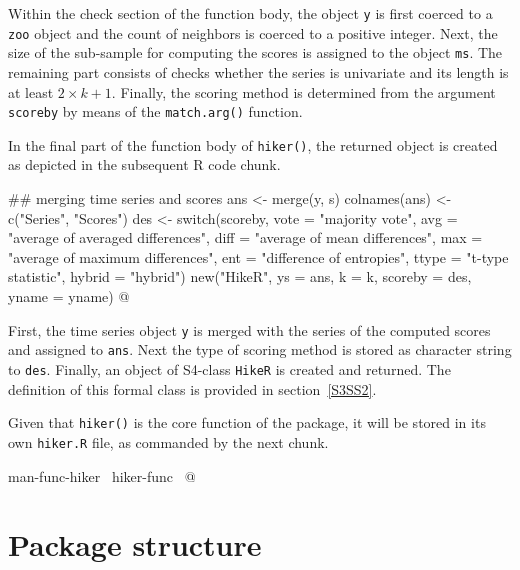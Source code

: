 \documentclass[a4paper]{article}
\begin{document}
Within the check section of the function body, the object \verb?y? is
first coerced to a \verb?zoo? object and the count of neighbors is
coerced to a positive integer. Next, the size of the sub-sample for
computing the scores is assigned to the object \verb?ms?. The remaining
part consists of checks whether the series is univariate and its
length is at least $2 \times k + 1$. Finally, the scoring method is
determined from the argument \verb?scoreby? by means of the \verb?match.arg()?
function.\par

In the final part of the function body of \verb?hiker()?, the returned
object is created as depicted in the subsequent R code chunk.

\nwenddocs{}\endmoddef
    ## merging time series and scores
    ans <- merge(y, s)
    colnames(ans) <- c("Series", "Scores")
    des <- switch(scoreby,
                  vote = "majority vote",
                  avg = "average of averaged differences",
                  diff = "average of mean differences",
                  max = "average of maximum differences",
                  ent = "difference of entropies",
                  ttype = "t-type statistic",
                  hybrid = "hybrid")
    new("HikeR", ys = ans, k = k, scoreby = des, yname = yname)
\nwendcode{}@

First, the time series object \verb?y? is merged with the series of the
computed scores and assigned to \verb?ans?. Next the type of scoring
method is stored as character string to \verb?des?. Finally, an object of
S4-class \verb?HikeR? is created and returned. The definition of this
formal class is provided in section~\ref{S3SS2}.\par

Given that \verb?hiker()? is the core function of the package, it will be
stored in its own \verb?hiker.R? file, as commanded by the next chunk.

\nwenddocs{}\endmoddef\let\nwnotused=\nwoutput{}
\LA{}man-func-hiker~{\nwtagstyle{}}\RA{}
\LA{}hiker-func~{\nwtagstyle{}}\RA{}
\nwnotused{hiker.R}\nwendcode{}@

\section{Package structure}
\label{S3}
\end{document}
